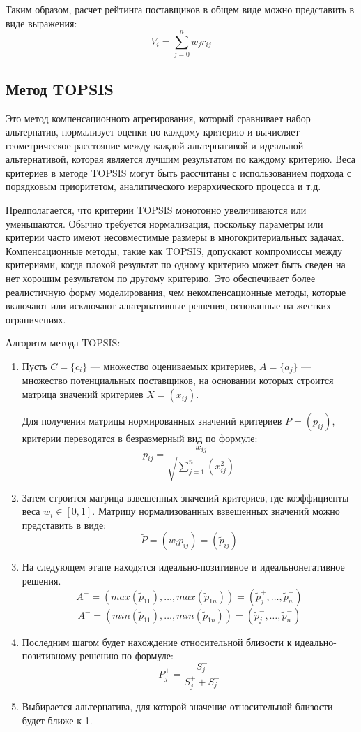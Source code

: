Таким образом, расчет рейтинга поставщиков в общем виде можно
представить в виде выражения:
\[V_i = \sum_{j=0}^{n} w_j r_{ij}\]

\subsection{Метод TOPSIS}
Это метод компенсационного агрегирования, который сравнивает набор
альтернатив, нормализует оценки по каждому критерию и вычисляет
геометрическое расстояние между каждой альтернативой и идеальной
альтернативой, которая является лучшим результатом по каждому критерию.
Веса критериев в методе TOPSIS могут быть рассчитаны с использованием
подхода с порядковым приоритетом, аналитического иерархического процесса и т.д.

Предполагается, что критерии TOPSIS монотонно увеличиваются или уменьшаются.
Обычно требуется нормализация, поскольку параметры или критерии часто имеют
несовместимые размеры в многокритериальных задачах.
Компенсационные методы, такие как TOPSIS, допускают компромиссы между
критериями, когда плохой результат по одному критерию может быть сведен
на нет хорошим результатом по другому критерию. Это обеспечивает более
реалистичную форму моделирования, чем некомпенсационные методы,
которые включают или исключают альтернативные решения, основанные на
жестких ограничениях.

Алгоритм метода TOPSIS:
\begin{enumerate}
    \item Пусть \(C = \{c_i\}\) --- множество оцениваемых критериев,
    \(A = \{a_j\}\) --- множество потенциальных поставщиков,
    на основании которых строится матрица значений критериев
    \(X = (x_{ij})\).\par
    Для получения матрицы нормированных значений критериев
    \(P = (p_{ij})\), критерии переводятся в безразмерный вид по формуле:
    \[p_{ij}=\frac{x_{ij}}{\sqrt{\sum_{j=1}^{n}(x_{ij}^2)}}\]
    \item Затем строится матрица взвешенных значений критериев,
    где коэффициенты веса \(w_i \in [0,1]\). Матрицу нормализованных
    взвешенных значений можно представить в виде:
    \[\tilde P=(w_i p_{ij})=(\tilde p_{ij})\]
    \item На следующем этапе находятся идеально-позитивное
    и идеальнонегативное решения.
    \[A^+=(max(\tilde p_{11}), \ldots, max(\tilde p_{1n}))
    =(\tilde p_j^+, \ldots, \tilde p_n^+)\]
    \[A^-=(min(\tilde p_{11}), \ldots, min(\tilde p_{1n}))
    =(\tilde p_j^-, \ldots, \tilde p_n^-)\]
    \item Последним шагом будет нахождение относительной близости к
    идеально-позитивному решению по формуле:
    \[P_j^+=\frac{S_{j}^-}{S_j^+ + S_j^-}\]
    \item Выбирается альтернатива, для которой значение относительной
    близости будет ближе к 1.
\end{enumerate}

